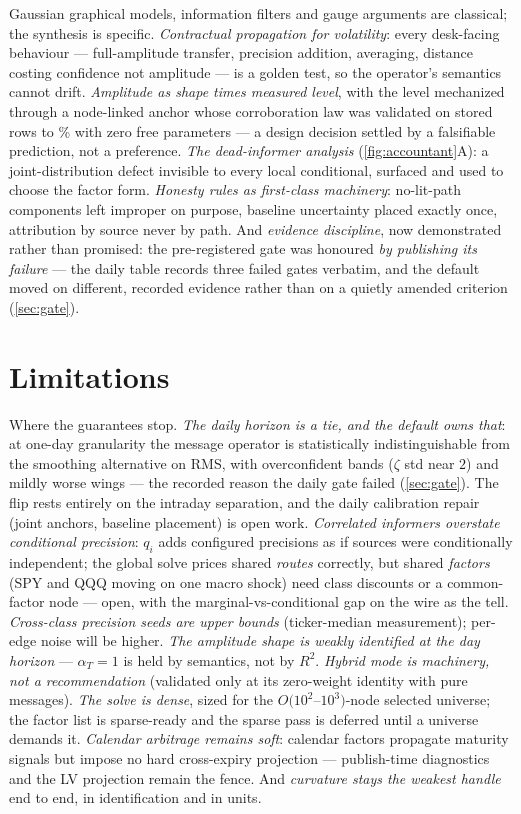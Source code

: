 \documentclass[11pt]{article}
\begin{document}
Gaussian graphical models, information filters and gauge arguments are
classical; the synthesis is specific.  \emph{Contractual propagation
for volatility}: every desk-facing behaviour --- full-amplitude
transfer, precision addition, averaging, distance costing confidence
not amplitude --- is a golden test, so the operator's semantics cannot
drift.  \emph{Amplitude as shape times measured level}, with the level
mechanized through a node-linked anchor whose corroboration law was
validated on stored rows to \gmpredgap\% with zero free parameters ---
a design decision settled by a falsifiable prediction, not a
preference.  \emph{The dead-informer analysis}
(\cref{fig:accountant}A): a joint-distribution defect invisible to
every local conditional, surfaced and used to choose the factor form.
\emph{Honesty rules as first-class machinery}: no-lit-path components
left improper on purpose, baseline uncertainty placed exactly once,
attribution by source never by path.  And \emph{evidence discipline},
now demonstrated rather than promised: the pre-registered gate was
honoured \emph{by publishing its failure} --- the daily table records
three failed gates verbatim, and the default moved on different,
recorded evidence rather than on a quietly amended criterion
(\cref{sec:gate}).

\section{Limitations}
\label{sec:limits}

Where the guarantees stop.  \emph{The daily horizon is a tie, and the
default owns that}: at one-day granularity the message operator is
statistically indistinguishable from the smoothing alternative on RMS,
with overconfident bands ($\zeta$ std near $2$) and mildly worse wings
--- the recorded reason the daily gate failed
(\cref{sec:gate}).  The flip rests entirely on the intraday
separation, and the daily calibration repair (joint anchors, baseline
placement) is open work.
\emph{Correlated informers overstate conditional precision}: $q_i$
adds configured precisions as if sources were conditionally
independent; the global solve prices shared \emph{routes} correctly,
but shared \emph{factors} (SPY and QQQ moving on one macro shock) need
class discounts or a common-factor node --- open, with the
marginal-vs-conditional gap on the wire as the tell.  \emph{Cross-class
precision seeds are upper bounds} (ticker-median measurement);
per-edge noise will be higher.  \emph{The amplitude shape is weakly
identified at the day horizon} --- $\alpha_T=1$ is held by semantics,
not by $R^2$.  \emph{Hybrid mode is machinery, not a recommendation}
(validated only at its zero-weight identity with pure messages).
\emph{The solve is dense}, sized for the $O(10^2$--$10^3)$-node
selected universe; the factor list is sparse-ready and the sparse pass
is deferred until a universe demands it.  \emph{Calendar arbitrage
remains soft}: calendar factors propagate maturity signals but impose
no hard cross-expiry projection --- publish-time diagnostics and the
LV projection remain the fence.  And \emph{curvature stays the weakest
handle} end to end, in identification and in units.
\end{document}
